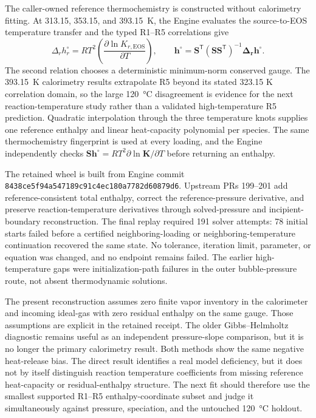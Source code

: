 \documentclass[10pt,oneside]{scrartcl}
\begin{document}
The caller-owned reference thermochemistry is constructed without calorimetry
fitting. At 313.15, 353.15, and \SI{393.15}{\kelvin}, the Engine evaluates the
source-to-EOS temperature transfer and the typed R1--R5 correlations give
\begin{equation}
\Delta_r h_r^\circ=RT^2\left(\frac{\partial\ln K_{r,\mathrm{EOS}}}
{\partial T}\right),\qquad
\mathbf{h}^\circ=\mathbf{S}^{\mathsf T}
(\mathbf{S}\mathbf{S}^{\mathsf T})^{-1}\boldsymbol{\Delta_r h}^\circ.
\label{eq:reaction-consistent-enthalpy-gauge}
\end{equation}
The second relation chooses a deterministic minimum-norm conserved gauge.
The \SI{393.15}{\kelvin} calorimetry results extrapolate R5 beyond its stated
323.15 K correlation domain, so the large \SI{120}{\celsius} disagreement is
evidence for the next reaction-temperature study rather than a validated
high-temperature R5 prediction.
Quadratic interpolation through the three temperature knots supplies one
reference enthalpy and linear heat-capacity polynomial per species. The same
thermochemistry fingerprint is used at every loading, and the Engine
independently checks $\mathbf{S}\mathbf{h}^\circ=RT^2\partial\ln\mathbf{K}/
\partial T$ before returning an enthalpy.

The retained wheel is built from Engine commit
\nolinkurl{8438ce5f94a547189c91c4ec180a7782d60879d6}. Upstream PRs 199--201 add
reference-consistent total enthalpy, correct the reference-pressure derivative,
and preserve reaction-temperature derivatives through solved-pressure and
incipient-boundary reconstruction. The final replay required 191 solver
attempts: 78 initial starts failed before a certified neighboring-loading or
neighboring-temperature continuation recovered the same state. No tolerance,
iteration limit, parameter, or equation was changed, and no endpoint remains
failed. The earlier high-temperature gaps were initialization-path failures in
the outer bubble-pressure route, not absent thermodynamic solutions.

The present reconstruction assumes zero finite vapor inventory in the
calorimeter and incoming ideal-gas  with zero residual enthalpy on the
same gauge. Those assumptions are explicit in the retained receipt. The older
Gibbs--Helmholtz diagnostic remains useful as an independent pressure-slope
comparison, but it is no longer the primary calorimetry result. Both methods
show the same negative heat-release bias. The direct result identifies a real
model deficiency, but it does not by itself distinguish reaction temperature
coefficients from missing reference heat-capacity or residual-enthalpy
structure. The next fit should therefore use the smallest supported R1--R5
enthalpy-coordinate subset and judge it simultaneously against pressure,
speciation, and the untouched \SI{120}{\celsius} holdout.
\end{document}
